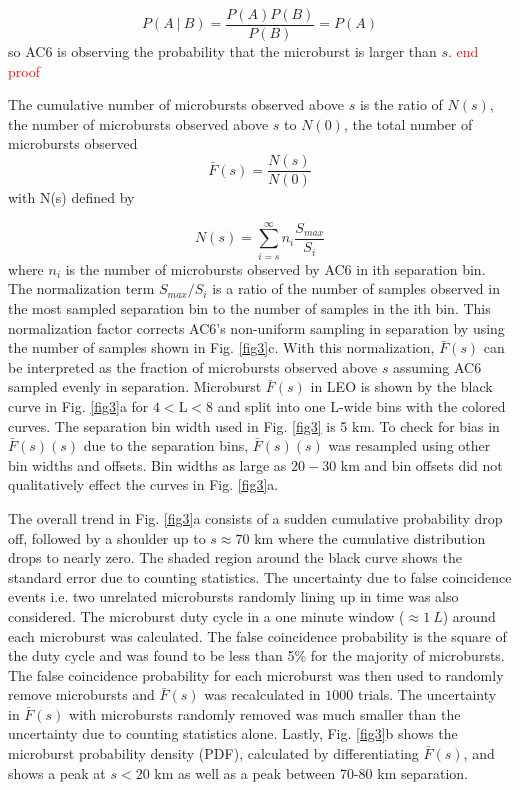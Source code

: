 \documentclass[draft]{agujournal2019}
\begin{document}
\begin{equation}
P(A \ \vert \ B) = \frac{P(A)P(B)}{P(B)} = P(A)
\end{equation} so AC6 is observing the probability that the microburst is larger than $s$. \textcolor{red}{end proof} 
\fi

The cumulative number of microbursts observed above $s$ is the ratio of $N(s)$, the number of microbursts observed above $s$ to $N(0)$, the total number of microbursts observed 
\begin{equation}
\bar{F}(s) = \frac{N(s)}{N(0)}
\end{equation} with N(s) defined by

\begin{equation}
N(s) = \sum_{i = s}^\infty n_{i} \frac{S_{max}}{S_{i}}
\end{equation} where $n_{i}$ is the number of microbursts observed by AC6 in ith separation bin. The normalization term $S_{max}/S_{i}$ is a ratio of the number of samples observed in the most sampled separation bin to the number of samples in the ith bin. This normalization factor corrects AC6's non-uniform sampling in separation by using the number of samples shown in Fig. \ref{fig3}c. With this normalization, $\bar{F}(s)$ can be interpreted as the fraction of microbursts observed above $s$ assuming AC6 sampled evenly in separation. Microburst $\bar{F}(s)$ in LEO is shown by the black curve in Fig. \ref{fig3}a for $4 < \mathrm{L}< 8$ and split into one L-wide bins with the colored curves. The separation bin width used in Fig. \ref{fig3} is 5 km. To check for bias in $\bar{F}(s)(s)$ due to the separation bins, $\bar{F}(s)(s)$ was resampled using other bin widths and offsets. Bin widths as large as $20-30$ km and bin offsets did not qualitatively effect the curves in Fig. \ref{fig3}a.

The overall trend in Fig. \ref{fig3}a consists of a sudden cumulative probability drop off, followed by a shoulder up to $s \approx 70$ km where the cumulative distribution drops to nearly zero. The shaded region around the black curve shows the standard error due to counting statistics. The uncertainty due to false coincidence events i.e. two unrelated microbursts randomly lining up in time was also considered. The microburst duty cycle in a one minute window ($\approx 1 \ L$) around each microburst was calculated. The false coincidence probability is the square of the duty cycle and was found to be less than 5\% for the majority of microbursts. The false coincidence probability for each microburst was then used to randomly remove microbursts and $\bar{F}(s)$ was recalculated in $1000$ trials. The uncertainty in $\bar{F}(s)$ with microbursts randomly removed was much smaller than the uncertainty due to counting statistics alone. Lastly, Fig. \ref{fig3}b shows the microburst probability density (PDF), calculated by differentiating $\bar{F}(s)$, and shows a peak at $s < 20 $ km as well as a peak between 70-80 km separation. 
\end{document}

